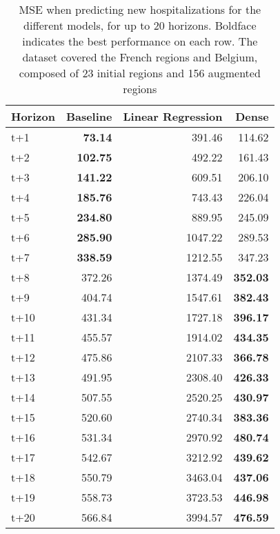 \begin{table}[H]
\centering
\caption{MSE when predicting new hospitalizations for the different models, for up to 20 horizons. Boldface indicates the best performance on each row. The dataset covered the French regions and Belgium, composed of 23 initial regions and 156 augmented regions }
\label{tab:MSE_comparison}
\begin{tabular}{lrrr}
\toprule
Horizon &  Baseline &  Linear Regression &  Dense \\
\midrule
t+1  & \textbf{73.14}  & 391.46  & 114.62  \\
t+2  & \textbf{102.75}  & 492.22  & 161.43  \\
t+3  & \textbf{141.22}  & 609.51  & 206.10  \\
t+4  & \textbf{185.76}  & 743.43  & 226.04  \\
t+5  & \textbf{234.80}  & 889.95  & 245.09  \\
t+6  & \textbf{285.90}  & 1047.22  & 289.53  \\
t+7  & \textbf{338.59}  & 1212.55  & 347.23  \\
t+8  & 372.26  & 1374.49  & \textbf{352.03}  \\
t+9  & 404.74  & 1547.61  & \textbf{382.43}  \\
t+10  & 431.34  & 1727.18  & \textbf{396.17}  \\
t+11  & 455.57  & 1914.02  & \textbf{434.35}  \\
t+12  & 475.86  & 2107.33  & \textbf{366.78}  \\
t+13  & 491.95  & 2308.40  & \textbf{426.33}  \\
t+14  & 507.55  & 2520.25  & \textbf{430.97}  \\
t+15  & 520.60  & 2740.34  & \textbf{383.36}  \\
t+16  & 531.34  & 2970.92  & \textbf{480.74}  \\
t+17  & 542.67  & 3212.92  & \textbf{439.62}  \\
t+18  & 550.79  & 3463.04  & \textbf{437.06}  \\
t+19  & 558.73  & 3723.53  & \textbf{446.98}  \\
t+20  & 566.84  & 3994.57  & \textbf{476.59}  \\

\bottomrule
\end{tabular}
\end{table}
